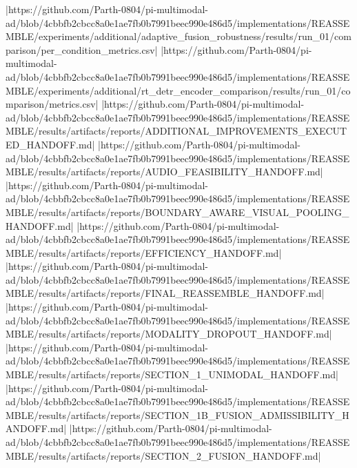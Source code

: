 |https://github.com/Parth-0804/pi-multimodal-ad/blob/4cbbfb2cbcc8a0e1ae7fb0b7991beec990e486d5/implementations/REASSEMBLE/experiments/additional/adaptive_fusion_robustness/results/run_01/comparison/per_condition_metrics.csv|
|https://github.com/Parth-0804/pi-multimodal-ad/blob/4cbbfb2cbcc8a0e1ae7fb0b7991beec990e486d5/implementations/REASSEMBLE/experiments/additional/rt_detr_encoder_comparison/results/run_01/comparison/metrics.csv|
|https://github.com/Parth-0804/pi-multimodal-ad/blob/4cbbfb2cbcc8a0e1ae7fb0b7991beec990e486d5/implementations/REASSEMBLE/results/artifacts/reports/ADDITIONAL_IMPROVEMENTS_EXECUTED_HANDOFF.md|
|https://github.com/Parth-0804/pi-multimodal-ad/blob/4cbbfb2cbcc8a0e1ae7fb0b7991beec990e486d5/implementations/REASSEMBLE/results/artifacts/reports/AUDIO_FEASIBILITY_HANDOFF.md|
|https://github.com/Parth-0804/pi-multimodal-ad/blob/4cbbfb2cbcc8a0e1ae7fb0b7991beec990e486d5/implementations/REASSEMBLE/results/artifacts/reports/BOUNDARY_AWARE_VISUAL_POOLING_HANDOFF.md|
|https://github.com/Parth-0804/pi-multimodal-ad/blob/4cbbfb2cbcc8a0e1ae7fb0b7991beec990e486d5/implementations/REASSEMBLE/results/artifacts/reports/EFFICIENCY_HANDOFF.md|
|https://github.com/Parth-0804/pi-multimodal-ad/blob/4cbbfb2cbcc8a0e1ae7fb0b7991beec990e486d5/implementations/REASSEMBLE/results/artifacts/reports/FINAL_REASSEMBLE_HANDOFF.md|
|https://github.com/Parth-0804/pi-multimodal-ad/blob/4cbbfb2cbcc8a0e1ae7fb0b7991beec990e486d5/implementations/REASSEMBLE/results/artifacts/reports/MODALITY_DROPOUT_HANDOFF.md|
|https://github.com/Parth-0804/pi-multimodal-ad/blob/4cbbfb2cbcc8a0e1ae7fb0b7991beec990e486d5/implementations/REASSEMBLE/results/artifacts/reports/SECTION_1_UNIMODAL_HANDOFF.md|
|https://github.com/Parth-0804/pi-multimodal-ad/blob/4cbbfb2cbcc8a0e1ae7fb0b7991beec990e486d5/implementations/REASSEMBLE/results/artifacts/reports/SECTION_1B_FUSION_ADMISSIBILITY_HANDOFF.md|
|https://github.com/Parth-0804/pi-multimodal-ad/blob/4cbbfb2cbcc8a0e1ae7fb0b7991beec990e486d5/implementations/REASSEMBLE/results/artifacts/reports/SECTION_2_FUSION_HANDOFF.md|
